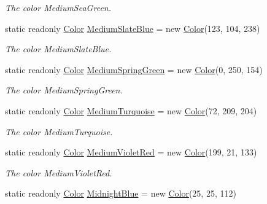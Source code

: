 \begin{DoxyCompactItemize}
\begin{DoxyCompactList}\small\item\em The color Medium\-Sea\-Green. \end{DoxyCompactList}\item 
static readonly \hyperlink{struct_tri_devs_1_1_tri_engine2_d_1_1_color}{Color} \hyperlink{struct_tri_devs_1_1_tri_engine2_d_1_1_color_afe9f39e12bdca208a996f8be55533854}{Medium\-Slate\-Blue} = new \hyperlink{struct_tri_devs_1_1_tri_engine2_d_1_1_color}{Color}(123, 104, 238)
\begin{DoxyCompactList}\small\item\em The color Medium\-Slate\-Blue. \end{DoxyCompactList}\item 
static readonly \hyperlink{struct_tri_devs_1_1_tri_engine2_d_1_1_color}{Color} \hyperlink{struct_tri_devs_1_1_tri_engine2_d_1_1_color_a2d6f85dd1e87a574468cf55fdd1dca91}{Medium\-Spring\-Green} = new \hyperlink{struct_tri_devs_1_1_tri_engine2_d_1_1_color}{Color}(0, 250, 154)
\begin{DoxyCompactList}\small\item\em The color Medium\-Spring\-Green. \end{DoxyCompactList}\item 
static readonly \hyperlink{struct_tri_devs_1_1_tri_engine2_d_1_1_color}{Color} \hyperlink{struct_tri_devs_1_1_tri_engine2_d_1_1_color_a70f58e227d17a9abf8a578267d640fe8}{Medium\-Turquoise} = new \hyperlink{struct_tri_devs_1_1_tri_engine2_d_1_1_color}{Color}(72, 209, 204)
\begin{DoxyCompactList}\small\item\em The color Medium\-Turquoise. \end{DoxyCompactList}\item 
static readonly \hyperlink{struct_tri_devs_1_1_tri_engine2_d_1_1_color}{Color} \hyperlink{struct_tri_devs_1_1_tri_engine2_d_1_1_color_a4fefbcd5b0adb65d4fb905ff4b1fbcba}{Medium\-Violet\-Red} = new \hyperlink{struct_tri_devs_1_1_tri_engine2_d_1_1_color}{Color}(199, 21, 133)
\begin{DoxyCompactList}\small\item\em The color Medium\-Violet\-Red. \end{DoxyCompactList}\item 
static readonly \hyperlink{struct_tri_devs_1_1_tri_engine2_d_1_1_color}{Color} \hyperlink{struct_tri_devs_1_1_tri_engine2_d_1_1_color_a9d3ce36d04c98282b94bf2fec372d275}{Midnight\-Blue} = new \hyperlink{struct_tri_devs_1_1_tri_engine2_d_1_1_color}{Color}(25, 25, 112)

\end{DoxyCompactItemize}
